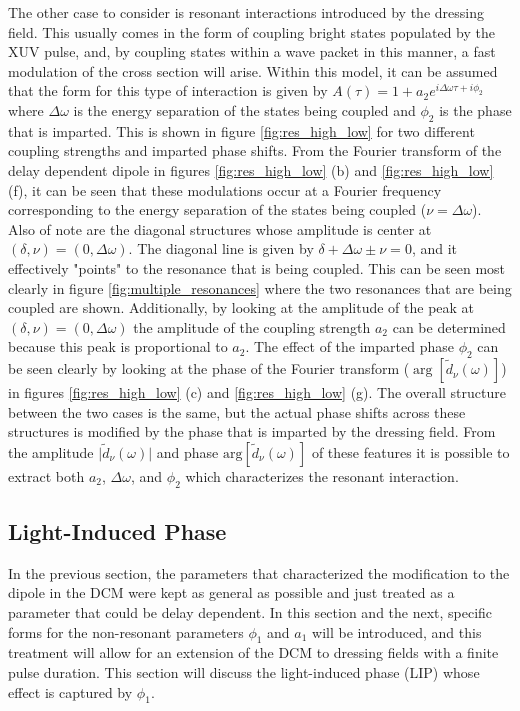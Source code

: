 The other case to consider is resonant interactions introduced by the dressing field.  This usually comes in the form of coupling bright states populated by the XUV pulse, and, by coupling states within a wave packet in this manner, a fast modulation of the cross section will arise.  Within this model, it can be assumed that the form for this type of interaction is given by $A(\tau)=1+a_2e^{i\Delta\omega\tau+i\phi_2}$ where $\Delta\omega$ is the energy separation of the states being coupled and $\phi_2$ is the phase that is imparted. This is shown in figure \ref{fig:res_high_low} for two different coupling strengths and imparted phase shifts.  From the Fourier transform of the delay dependent dipole in figures \ref{fig:res_high_low} (b) and \ref{fig:res_high_low} (f), it can be seen that these modulations occur at a Fourier frequency corresponding to the energy separation of the states being coupled ($\nu=\Delta\omega$).  Also of note are the diagonal structures whose amplitude is center at $(\delta,\nu)=(0,\Delta\omega)$.  The diagonal line is given by $\delta+\Delta\omega\pm\nu=0$, and it effectively "points" to the resonance that is being coupled.  This can be seen most clearly in figure \ref{fig:multiple_resonances} where the two resonances that are being coupled are shown.  Additionally, by looking at the amplitude of the peak at $(\delta,\nu)=(0,\Delta\omega)$ the amplitude of the coupling strength $a_2$ can be determined because this peak is proportional to $a_2$.  The effect of the imparted phase $\phi_2$ can be seen clearly by looking at the phase of the Fourier transform ($\arg[\tilde{d}_{\nu}(\omega)]$) in figures \ref{fig:res_high_low} (c) and \ref{fig:res_high_low} (g).  The overall structure between the two cases is the same, but the actual phase shifts across these structures is modified by the phase that is imparted by the dressing field.  From the amplitude $\rvert\tilde{d}_\nu(\omega)\lvert$ and phase $\mathrm{arg}[\tilde{d}_\nu(\omega)]$ of these features it is possible to extract both $a_2$, $\Delta\omega$, and $\phi_2$ which characterizes the resonant interaction.



\subsection{Light-Induced Phase}
\label{sec:LIP}
In the previous section, the parameters that characterized the modification to the dipole in the DCM were kept as general as possible and just treated as a parameter that could be delay dependent.  In this section and the next, specific forms for the non-resonant parameters $\phi_1$ and $a_1$ will be introduced, and this treatment will allow for an extension of the DCM to dressing fields with a finite pulse duration.  This section will discuss the light-induced phase (LIP) whose effect is captured by $\phi_1$. 

